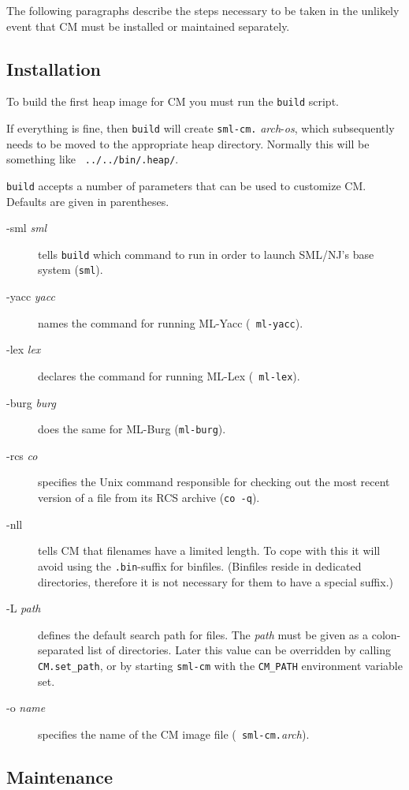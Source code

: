 \documentclass{article}
\begin{document}
The following paragraphs describe the steps necessary to be taken in
the unlikely event that CM must be installed or maintained separately.

\subsection{Installation}

To build the first heap image for CM you must run the {\tt build}
script.

If everything is fine, then {\tt build} will create {\tt sml-cm.}{\em
arch}-{\em os}, which subsequently needs to be moved to the
appropriate heap directory.  Normally this will be something like {\tt
../../bin/.heap/}.

{\tt build} accepts a number of parameters that can be used to
customize CM. Defaults are given in parentheses.

\begin{description}
\item[-sml {\it sml}] tells {\tt build} which command to run in order
to launch SML/NJ's base system ({\tt sml}).
\item[-yacc {\it yacc}] names the command for running ML-Yacc ({\tt
ml-yacc}).
\item[-lex {\it lex}] declares the command for running ML-Lex ({\tt
ml-lex}).
\item[-burg {\it burg}] does the same for ML-Burg ({\tt ml-burg}).
\item[-rcs {\it co}] specifies the {\sc Unix} command responsible for
checking out the most recent version of a file from its RCS archive
({\tt co -q}).
\item[-nll] tells CM that filenames have a limited length.  To
cope with this it will avoid using the {\tt.bin}-suffix for
binfiles. (Binfiles reside in dedicated directories, therefore it
is not necessary for them to have a special suffix.)
\item[-L {\it path}] defines the default search path for files.
The {\it path} must be given as a colon-separated list of directories.
Later this value can be overridden by calling \verb|CM.set_path|, or by
starting {\tt sml-cm} with the \verb|CM_PATH| environment variable
set.
\item[-o {\it name}] specifies the name of the CM image file ({\tt
sml-cm.}{\em arch}).
\end{description}

\subsection{Maintenance}
\end{document}

